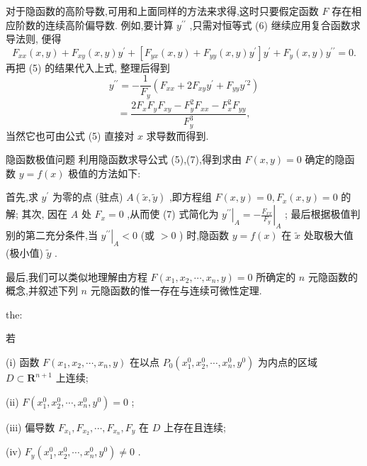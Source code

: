 对于隐函数的高阶导数,可用和上面同样的方法来求得,这时只要假定函数 \(F\) 存在相应阶数的连续高阶偏导数. 例如,要计算 \({y}^{\prime \prime }\) ,只需对恒等式 (6) 继续应用复合函数求导法则, 便得
\[
{F}_{xx}\left( {x,y}\right)  + {F}_{xy}\left( {x,y}\right) {y}^{\prime } + \left\lbrack  {{F}_{yx}\left( {x,y}\right)  + {F}_{yy}\left( {x,y}\right) {y}^{\prime }}\right\rbrack  {y}^{\prime } + {F}_{y}\left( {x,y}\right) {y}^{\prime \prime } = 0.
\]
再把 (5) 的结果代入上式, 整理后得到
\[
{y}^{\prime \prime } =  - \frac{1}{{F}_{y}}\left( {{F}_{xx} + 2{F}_{xy}{y}^{\prime } + {F}_{yy}{y}^{\prime 2}}\right)
\]
\[
= \frac{2{F}_{x}{F}_{y}{F}_{xy} - {F}_{y}^{2}{F}_{xx} - {F}_{x}^{2}{F}_{yy}}{{F}_{y}^{3}}, \tag{7}
\]
当然它也可由公式 (5) 直接对 \(x\) 求导数而得到.

隐函数极值问题 利用隐函数求导公式 (5),(7),得到求由 \(F\left( {x,y}\right)  = 0\) 确定的隐函数 \(y = f\left( x\right)\) 极值的方法如下:

首先,求 \({y}^{\prime }\) 为零的点 (驻点) \(A\left( {\widetilde{x},\widetilde{y}}\right)\) ,即方程组 \(F\left( {x,y}\right)  = 0,{F}_{x}\left( {x,y}\right)  = 0\) 的解; 其次, 因在 \(A\) 处 \({F}_{x} = 0\) ,从而使 (7) 式简化为 \({\left. {y}^{\prime \prime }\right| }_{A} =  - {\left. \frac{{F}_{xx}}{{F}_{y}}\right| }_{A}\) ; 最后根据极值判别的第二充分条件,当 \({\left. {y}^{\prime \prime }\right| }_{A} < 0\) (或 \(> 0\) ) 时,隐函数 \(y = f\left( x\right)\) 在 \(\widetilde{x}\) 处取极大值 (极小值) \(\widetilde{y}\) .

最后,我们可以类似地理解由方程 \(F\left( {{x}_{1},{x}_{2},\cdots ,{x}_{n},y}\right)  = 0\) 所确定的 \(n\) 元隐函数的概念,并叙述下列 \(n\) 元隐函数的惟一存在与连续可微性定理.

\begin{theorem}{}{the:}

\end{theorem}
 若

(i) 函数 \(F\left( {{x}_{1},{x}_{2},\cdots ,{x}_{n},y}\right)\) 在以点 \({P}_{0}\left( {{x}_{1}^{0},{x}_{2}^{0},\cdots ,{x}_{n}^{0},{y}^{0}}\right)\) 为内点的区域 \(D \subset  {\mathbf{R}}^{n + 1}\) 上连续;

(ii) \(F\left( {{x}_{1}^{0},{x}_{2}^{0},\cdots ,{x}_{n}^{0},{y}^{0}}\right)  = 0\) ;

(iii) 偏导数 \({F}_{{x}_{1}},{F}_{{x}_{2}},\cdots ,{F}_{{x}_{n}},{F}_{y}\) 在 \(D\) 上存在且连续;

(iv) \({F}_{y}\left( {{x}_{1}^{0},{x}_{2}^{0},\cdots ,{x}_{n}^{0},{y}^{0}}\right)  \neq  0\) .

